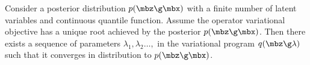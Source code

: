 \begin{theorem}
  Consider a posterior distribution $p(\mbz\g\mbx)$ with a finite number of latent
  variables and continuous quantile function.
  Assume the operator variational objective has a unique root achieved
  by the posterior $p(\mbz\g\mbx)$.
  Then there exists a sequence of parameters
  $\lambda_1,\lambda_2\ldots,$ in the variational program
  $q(\mbz\g\lambda)$ such that it converges in distribution to
  $p(\mbz\g\mbx)$.
\end{theorem}
